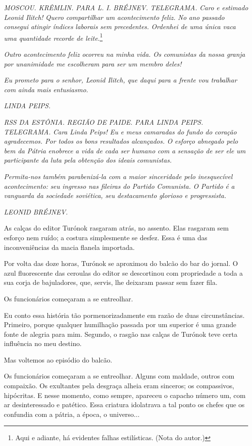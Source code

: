 \emph{MOSCOU. KRÊMLIN. PARA L. I. BRÉJNEV. TELEGRAMA. Caro e estimado
Leonid Ilitch! Quero compartilhar um acontecimento feliz. No ano passado
consegui atingir índices laborais sem precedentes. Ordenhei de uma única
vaca uma quantidade recorde de leite.}\footnote{Aqui e adiante, há
  evidentes falhas estilísticas. (Nota do autor.)}

\emph{Outro acontecimento feliz ocorreu na minha vida. Os comunistas da
nossa granja por unanimidade me escolheram para ser um membro deles!}

\emph{Eu prometo para o senhor, Leonid Ilitch, que daqui para a frente
vou trabalhar com ainda mais entusiasmo.}

\emph{LINDA PEIPS.}

\emph{RSS DA ESTÔNIA. REGIÃO DE PAIDE. PARA LINDA PEIPS. TELEGRAMA. Cara
Linda Peips! Eu e meus camaradas do fundo do coração agradecemos. Por
todos os bons resultados alcançados. O esforço abnegado pelo bem da
Pátria enobrece a vida de cada ser humano com a sensação de ser ele um
participante da luta pela obtenção dos ideais comunistas.}

\emph{Permita-nos também parabenizá-la com a maior sinceridade pelo
inesquecível acontecimento: seu ingresso nas fileiras do Partido
Comunista. O Partido é a vanguarda da sociedade soviética, seu
destacamento glorioso e progressista.}

\emph{LEONID BRÉJNEV.}

As calças do editor Turónok rasgaram atrás, no assento. Elas rasgaram
sem esforço nem ruído; a costura simplesmente se desfez. Essa é uma das
inconveniências da macia flanela importada.

Por volta das doze horas, Turónok se aproximou do balcão do bar do
jornal. O azul fluorescente das ceroulas do editor se descortinou com
propriedade a toda a sua corja de bajuladores, que, servis, lhe deixaram
passar sem fazer fila.

Os funcionários começaram a se entreolhar.

Eu conto essa história tão pormenorizadamente em razão de duas
circunstâncias. Primeiro, porque qualquer humilhação passada por um
superior é uma grande fonte de alegria para mim. Segundo, o rasgão nas
calças de Turónok teve certa influência no meu destino.

Mas voltemos ao episódio do balcão.

Os funcionários começaram a se entreolhar. Alguns com maldade, outros
com compaixão. Os exultantes pela desgraça alheia eram sinceros; os
compassivos, hipócritas. E nesse momento, como sempre, apareceu o
capacho número um, com ar desinteressado e patético. Essa criatura
idolatrava a tal ponto os chefes que os confundia com a pátria, a época,
o universo...

